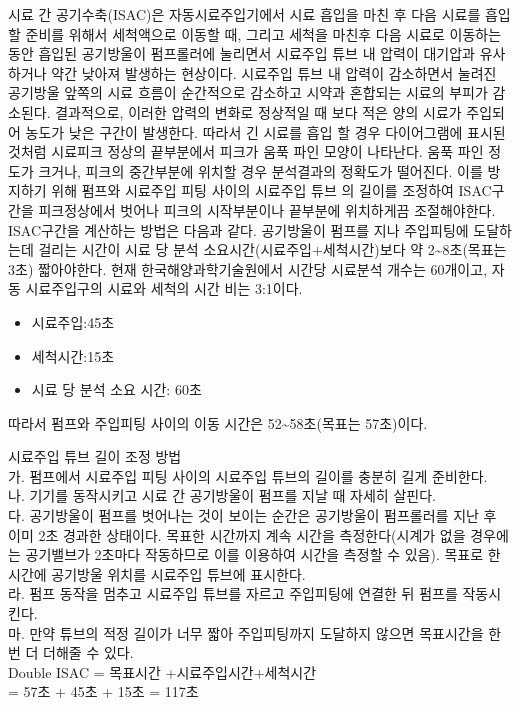 \documentclass[
]{book}
\providecommand{\tightlist}{%
  \setlength{\itemsep}{0pt}\setlength{\parskip}{0pt}}
\begin{document}
시료 간 공기수축(ISAC)은 자동시료주입기에서 시료 흡입을 마친 후 다음 시료를 흡입 할 준비를 위해서 세척액으로 이동할 때, 그리고 세척을 마친후 다음 시료로 이동하는 동안 흡입된 공기방울이 펌프롤러에 눌리면서 시료주입 튜브 내 압력이 대기압과 유사하거나 약간 낮아져 발생하는 현상이다. 시료주입 튜브 내 압력이 감소하면서 눌려진 공기방울 앞쪽의 시료 흐름이 순간적으로 감소하고 시약과 혼합되는 시료의 부피가 감소된다. 결과적으로, 이러한 압력의 변화로 정상적일 때 보다 적은 양의 시료가 주입되어 농도가 낮은 구간이 발생한다.
따라서 긴 시료를 흡입 할 경우 다이어그램에 표시된 것처럼 시료피크 정상의 끝부분에서 피크가 움푹 파인 모양이 나타난다. 움푹 파인 정도가 크거나, 피크의 중간부분에 위치할 경우 분석결과의 정확도가 떨어진다. 이를 방지하기 위해 펌프와 시료주입 피팅 사이의 시료주입 튜브 의 길이를 조정하여 ISAC구간을 피크정상에서 벗어나 피크의 시작부분이나 끝부분에 위치하게끔 조절해야한다. ISAC구간을 계산하는 방법은 다음과 같다. 공기방울이 펌프를 지나 주입피팅에 도달하는데 걸리는 시간이 시료 당 분석 소요시간(시료주입+세척시간)보다 약 2\textasciitilde8초(목표는 3초) 짧아야한다.
현재 한국해양과학기술원에서 시간당 시료분석 개수는 60개이고, 자동 시료주입구의 시료와 세척의 시간 비는 3:1이다.

\begin{itemize}
\tightlist
\item
  시료주입:45초
\item
  세척시간:15초
\item
  시료 당 분석 소요 시간: 60초
\end{itemize}

따라서 펌프와 주입피팅 사이의 이동 시간은 52\textasciitilde58초(목표는 57초)이다.

시료주입 튜브 길이 조정 방법\\
가. 펌프에서 시료주입 피팅 사이의 시료주입 튜브의 길이를 충분히 길게 준비한다.\\
나. 기기를 동작시키고 시료 간 공기방울이 펌프를 지날 때 자세히 살핀다.\\
다. 공기방울이 펌프를 벗어나는 것이 보이는 순간은 공기방울이 펌프롤러를 지난 후 이미 2초 경과한 상태이다. 목표한 시간까지 계속 시간을 측정한다(시계가 없을 경우에는 공기밸브가 2초마다 작동하므로 이를 이용하여 시간을 측정할 수 있음). 목표로 한 시간에 공기방울 위치를 시료주입 튜브에 표시한다.\\
라. 펌프 동작을 멈추고 시료주입 튜브를 자르고 주입피팅에 연결한 뒤 펌프를 작동시킨다.\\
마. 만약 튜브의 적정 길이가 너무 짧아 주입피팅까지 도달하지 않으면 목표시간을 한 번 더 더해줄 수 있다.\\
Double ISAC = 목표시간 +시료주입시간+세척시간\\
= 57초 + 45초 + 15초 = 117초
\end{document}
